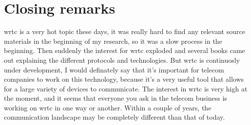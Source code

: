 \section{Closing remarks}
\gls{wrtc} is a very hot topic these days, it was really hard to find any relevant source materials in the beginning of my research, so it was a slow process in the beginning. Then suddenly the interest for \gls{wrtc} exploded and several books came out explaining the different protocols and technologies. But \gls{wrtc} is continuosly under development, I would definately say that it's important for telecom companies to work on this technology, because it's a very useful tool that allows for a large variety of devices to communicate. The interest in \gls{wrtc} is very high at the moment, and it seems that everyone you ask in the telecom business is working on \gls{wrtc} in one way or another. Within a couple of years, the communication landscape may be completely different than that of today.